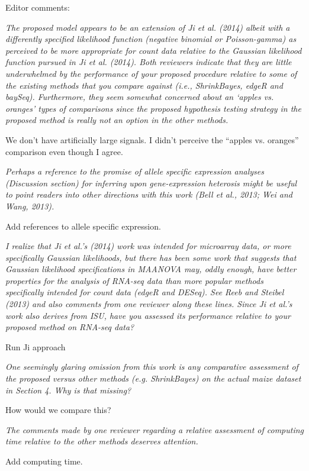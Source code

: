 \documentclass{article}
\newcommand{\comment}[1]{\textit{#1}}
\newcommand{\todo}[1]{{\color{red} #1}}
\begin{document}
Editor comments:

\comment{The proposed model appears to be an extension of Ji et al. (2014) albeit with a differently specified likelihood function (negative binomial or Poisson-gamma) as perceived to be more appropriate for count data relative to the Gaussian likelihood function pursued in Ji et al. (2014). Both reviewers indicate that they are little underwhelmed by the performance of your proposed procedure relative to some of the existing methods that you compare against (i.e., ShrinkBayes, edgeR and baySeq).  Furthermore, they seem somewhat concerned about an ‘apples vs. oranges’ types of comparisons since the proposed hypothesis testing strategy in the proposed method is really not an option in the other methods.}

\todo{We don't have artificially large signals. I didn't perceive the ``apples vs. oranges'' comparison even though I agree.}

\comment{Perhaps a reference to the promise of allele specific expression analyses (Discussion section) for inferring upon gene-expression heterosis might be useful to point readers into other directions with this work (Bell et al., 2013; Wei and Wang, 2013).}

\todo{Add references to allele specific expression.}

\comment{I realize that Ji et al.’s (2014) work was intended for microarray data, or more specifically Gaussian likelihoods, but there has been some work that suggests that Gaussian likelihood specifications in MAANOVA may, oddly enough, have better properties for the analysis of RNA-seq data than more popular methods specifically intended for count data (edgeR and DESeq).  See Reeb and Steibel (2013) and also comments from one reviewer along these lines.  Since Ji et al.’s work also derives from ISU, have you assessed its performance relative to your proposed method on RNA-seq data?}

\todo{Run Ji approach}

\comment{One seemingly glaring omission from this work is any comparative assessment of the proposed versus other methods (e.g. ShrinkBayes) on the actual maize dataset in Section 4.  Why is that missing?}

\todo{How would we compare this?}

\comment{The comments made by one reviewer regarding a relative assessment of computing time relative to the other methods deserves attention.}

\todo{Add computing time.}
\end{document}
